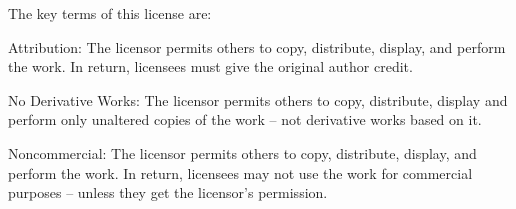 \documentclass[a4paper,11pt]{book}
\begin{document}
\noindent 

\noindent The key terms of this license are:

\noindent 

\noindent Attribution: The licensor permits others to copy, distribute, display, and perform the work. In return, licensees must give the original author credit.

\noindent 

\noindent No  Derivative  Works: The licensor permits others to copy, distribute, display and perform only unaltered copies of the work -- not derivative works based on it.

\noindent 

\noindent Noncommercial: The licensor permits others to copy, distribute, display, and perform the work. In return, licensees may not use the work for commercial purposes -- unless they get the licensor's permission.
\end{document}
